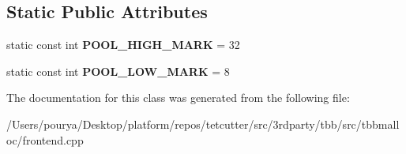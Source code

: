 \subsection*{Static Public Attributes}
\begin{DoxyCompactItemize}
\item 
\hypertarget{classrml_1_1internal_1_1FreeBlockPool_a6e0b38bdab3a76180e356b4707320b73}{}static const int {\bfseries P\+O\+O\+L\+\_\+\+H\+I\+G\+H\+\_\+\+M\+A\+R\+K} = 32\label{classrml_1_1internal_1_1FreeBlockPool_a6e0b38bdab3a76180e356b4707320b73}

\item 
\hypertarget{classrml_1_1internal_1_1FreeBlockPool_a4966b4cf11130701d61cc63b4385054a}{}static const int {\bfseries P\+O\+O\+L\+\_\+\+L\+O\+W\+\_\+\+M\+A\+R\+K} = 8\label{classrml_1_1internal_1_1FreeBlockPool_a4966b4cf11130701d61cc63b4385054a}

\end{DoxyCompactItemize}


The documentation for this class was generated from the following file\+:\begin{DoxyCompactItemize}
\item 
/\+Users/pourya/\+Desktop/platform/repos/tetcutter/src/3rdparty/tbb/src/tbbmalloc/frontend.\+cpp\end{DoxyCompactItemize}
